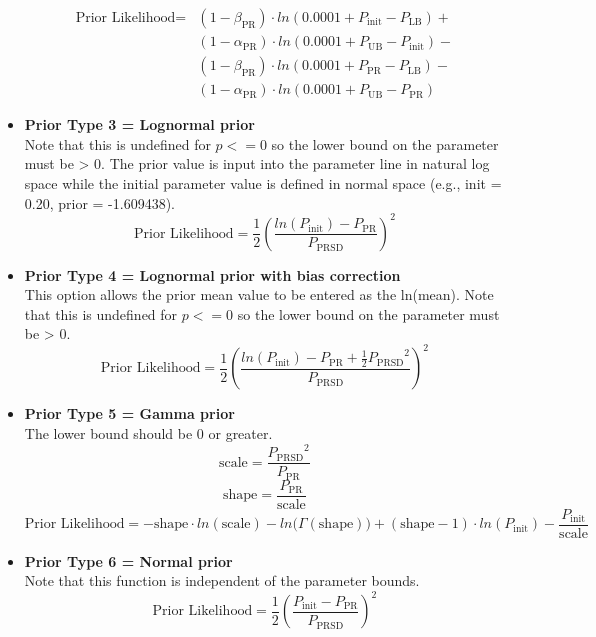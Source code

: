 \begin{itemize}
	\begin{equation}
		\begin{split}
\text{Prior Likelihood} = &(1 - \beta_\text{PR}) \cdot ln(0.0001 + P_\text{init} - P_\text{LB}) + \\
&(1 - \alpha_\text{PR}) \cdot ln(0.0001 + P_\text{UB} - P_\text{init}) - \\
&(1 - \beta_\text{PR}) \cdot ln(0.0001 + P_\text{PR} - P_\text{LB}) - \\
&(1 - \alpha_\text{PR}) \cdot ln(0.0001 + P_\text{UB} - P_\text{PR})
		\end{split}
	\end{equation}	

	
	\item \textbf{Prior Type 3 = Lognormal prior} \\ 
	Note that this is undefined for $p <= 0$ so the lower bound on the parameter must be > 0. The prior value is input into the parameter line in natural log space while the initial parameter value is defined in normal space (e.g., init = 0.20, prior = -1.609438).
	\begin{equation}
		\text{Prior Likelihood} = \frac{1}{2} \left(\frac{ln(P_\text{init})-P_\text{PR}}{P_\text{PRSD}}\right)^2
	\end{equation}
	
	\item \textbf{Prior Type 4 = Lognormal prior with bias correction} \\ 
	This option allows the prior mean value to be entered as the ln(mean). Note that this is undefined for $p <= 0$ so the lower bound on the parameter must be > 0.
	\begin{equation}
		\text{Prior Likelihood} = \frac{1}{2} \left(\frac{ln(P_\text{init})-P_\text{PR} + \frac{1}{2}{P_\text{PRSD}}^2}{P_\text{PRSD}}\right)^2
	\end{equation}
	
	\item \textbf{Prior Type 5 = Gamma prior} \\ 
	The lower bound should be 0 or greater.
	\begin{equation}
		\text{scale} = \frac{{P_\text{PRSD}}^2}{P_\text{PR}}
	\end{equation}
	\begin{equation}
		\text{shape} = \frac{P_\text{PR}}{\text{scale}}
	\end{equation}
	\begin{equation}
		\text{Prior Likelihood} = -\text{shape} \cdot ln(\text{scale}) - ln\big(\Gamma(\text{shape})\big) + (\text{shape} - 1) \cdot ln(P_\text{init}) - \frac{P_\text{init}}{\text{scale}}
	\end{equation}
	
	\item \textbf{Prior Type 6 = Normal prior} \\ 
	Note that this function is independent of the parameter bounds.
	\begin{equation}
		\text{Prior Likelihood} = \frac{1}{2} \left(\frac{P_\text{init} - P_\text{PR}}{P_\text{PRSD}}\right)^2
	\end{equation}
\end{itemize}






\pagebreak